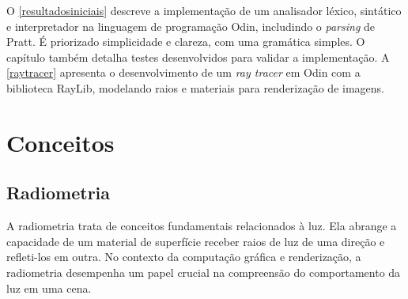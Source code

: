 \documentclass[english, 
               brazil, 
               bsc] %
               {dcomp-abntex2}
\begin{document}
O \autoref{resultadosiniciais} descreve a implementação de um analisador léxico, sintático e interpretador na linguagem de programação Odin, includindo o \textit{parsing} de Pratt. É priorizado simplicidade e clareza, com uma gramática  simples. O capítulo também detalha testes desenvolvidos para validar a implementação. A \autoref{raytracer} apresenta o desenvolvimento de um \textit{ray tracer} em Odin com a biblioteca RayLib, modelando raios e materiais para renderização de imagens.








\chapter{Conceitos} \label{conceitos}

\section{Radiometria} \label{radiometria}

A radiometria trata de conceitos fundamentais relacionados à luz. Ela abrange a capacidade de um material de superfície receber raios de luz de uma direção e refleti-los em outra. No contexto da computação gráfica e renderização, a radiometria desempenha um papel crucial na compreensão do comportamento da luz em uma cena.
\end{document}
